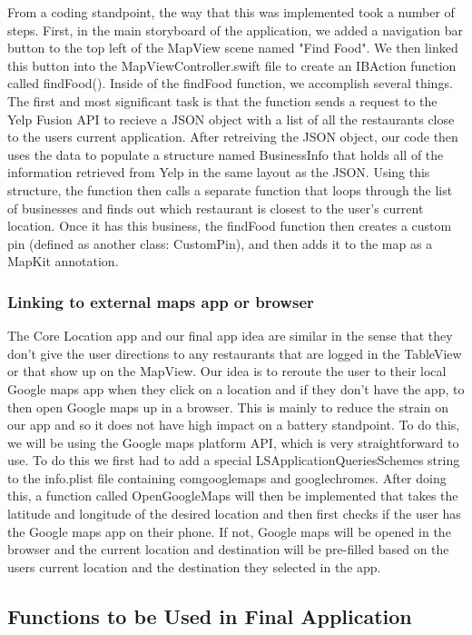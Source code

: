 \documentclass[conference]{IEEEtran}
\begin{document}
From a coding standpoint, the way that this was implemented took a number of steps.
First, in the main storyboard of the application, we added a navigation bar button
to the top left of the MapView scene named "Find Food". We then linked this button
into the MapViewController.swift file to create an IBAction function called findFood().
Inside of the findFood function, we accomplish several things. The first and 
most significant task is that the function sends a request to the Yelp Fusion API
to recieve a JSON object with a list of all the restaurants close to the users current
application. After retreiving the JSON object, our code then uses the data to populate
a structure named BusinessInfo that holds all of the information retrieved from Yelp
in the same layout as the JSON. Using this structure, the function then calls a separate
function that loops through the list of businesses and finds out which restaurant
is closest to the user's current location. Once it has this business, the findFood
function then creates a custom pin (defined as another class: CustomPin), and then
adds it to the map as a MapKit annotation.

\subsubsection{Linking to external maps app or browser}

The Core Location app and our final app idea are similar in the sense that they don't give the user directions to any restaurants that are logged in the TableView or that show up on the MapView. Our idea is to reroute the user to their local Google maps app when they click on a location and if they don't have the app, to then open Google maps up in a browser. This is mainly to reduce the strain on our app and so it does not have high impact on a battery standpoint. To do this, we will be using the Google maps platform API, which is very straightforward to use. To do this we first had to add a special LSApplicationQueriesSchemes string to the info.plist file containing comgooglemaps and googlechromes. After doing this, a function called OpenGoogleMaps will then be implemented that takes the latitude and longitude of the desired location and then first checks if the user has the Google maps app on their phone. If not, Google maps will be opened in the browser and the current location and destination will be pre-filled based on the users current location and the destination they selected in the app.

\subsection{Functions to be Used in Final Application}
\end{document}
